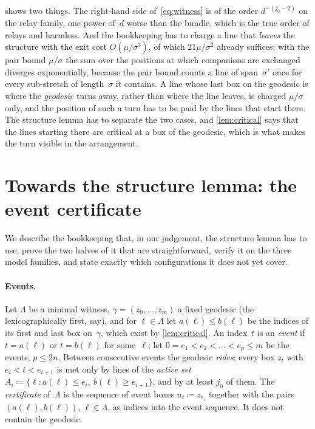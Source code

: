 \documentclass[11pt,letterpaper]{article}
\begin{document}
 shows two things. The right-hand side of~\eqref{eq:witness} is of the order $d^{-(j_0-2)}$ on the relay family, one power of~$d$ worse than the bundle, which is the true order of relays and harmless. And the bookkeeping has to charge a line that \emph{leaves} the structure with the exit cost $O(\mu/\sigma^3)$, of which $21\mu/\sigma^2$ already suffices: with the pair bound $\mu/\sigma$ the sum over the positions at which companions are exchanged diverges exponentially, because the pair bound counts a line of span~$\sigma'$ once for every sub-stretch of length~$\sigma$ it contains. A line whose last box on the geodesic is where the \emph{geodesic} turns away, rather than where the line leaves, is charged $\mu/\sigma$ only, and the position of such a turn has to be paid by the lines that start there. The structure lemma has to separate the two cases, and \cref{lem:critical} says that the lines starting there are critical at a box of the geodesic, which is what makes the turn visible in the arrangement.

\section{Towards the structure lemma: the event certificate}
\label{sec:events}

We describe the bookkeeping that, in our judgement, the structure lemma has to use, prove the two halves of it that are straightforward, verify it on the three model families, and state exactly which configurations it does not yet cover.

\paragraph{Events.} Let $\Lambda$ be a minimal witness, $\gamma=(z_0,\dots,z_m)$ a fixed geodesic (the lexicographically first, say), and for $\ell\in\Lambda$ let $a(\ell)\le b(\ell)$ be the indices of its first and last box on~$\gamma$, which exist by \cref{lem:critical}. An index~$t$ is an \emph{event} if $t=a(\ell)$ or $t=b(\ell)$ for some~$\ell$; let $0=e_1<e_2<\dots<e_p\le m$ be the events, $p\le2n$. Between consecutive events the geodesic \emph{rides}: every box $z_t$ with $e_i<t<e_{i+1}$ is met only by lines of the \emph{active set} $A_i\coloneqq\{\ell\colon a(\ell)\le e_i,\ b(\ell)\ge e_{i+1}\}$, and by at least $j_0$ of them. The \emph{certificate} of~$\Lambda$ is the sequence of event boxes $u_i\coloneqq z_{e_i}$ together with the pairs $(a(\ell),b(\ell))$, $\ell\in\Lambda$, as indices into the event sequence. It does not contain the geodesic.
\end{document}
